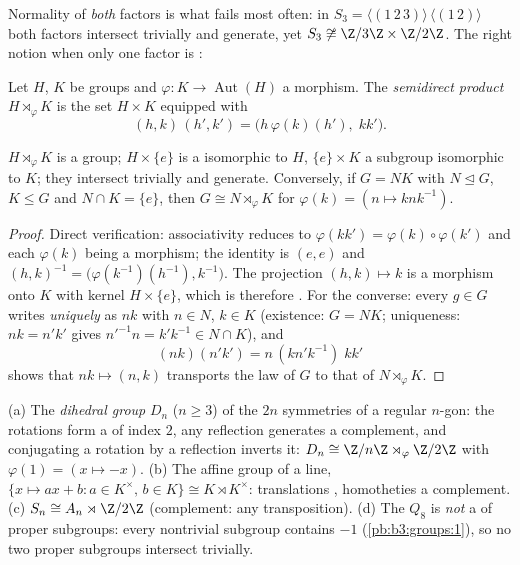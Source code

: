 Normality of \emph{both} factors is what fails most often: in $S_3
= \langle (1\,2\,3)\rangle \,\langle(1\,2)\rangle$ both factors
intersect trivially and generate, yet $S_3 \not\cong \Z/3\Z \times
\Z/2\Z$. The right notion when only one factor is :

\begin{definition}\label{def:b3:groups:semidirect}
Let $H$, $K$ be groups and $\varphi \colon K \to
\operatorname{Aut}(H)$ a morphism. The \emph{semidirect
product} $H \rtimes_\varphi K$ is the
set $H \times K$ equipped with
\[
(h, k)\,(h', k') = \bigl(h\,\varphi(k)(h'),\; kk'\bigr).
\]
\end{definition}

\begin{proposition}\label{prop:b3:groups:semidirect}
$H \rtimes_\varphi K$ is a group; $H \times \{e\}$ is a  isomorphic to $H$, $\{e\} \times K$ a subgroup isomorphic
to $K$; they intersect trivially and generate. Conversely, if $G =
NK$ with $N \trianglelefteq G$, $K \leq G$ and $N \cap K = \{e\}$,
then $G \cong N \rtimes_\varphi K$ for $\varphi(k) = (n \mapsto
knk^{-1})$.
\end{proposition}

\begin{proof}
Direct verification: associativity reduces to $\varphi(kk') =
\varphi(k)\circ\varphi(k')$ and each $\varphi(k)$ being a morphism;
the identity is $(e,e)$ and $(h,k)^{-1} =
\bigl(\varphi(k^{-1})(h^{-1}), k^{-1}\bigr)$. The projection $(h,k)
\mapsto k$ is a morphism onto $K$ with kernel $H \times \{e\}$,
which is therefore . For the converse: every $g \in G$ writes
\emph{uniquely} as $nk$ with $n \in N$, $k \in K$ (existence: $G =
NK$; uniqueness: $nk = n'k'$ gives $n'^{-1}n = k'k^{-1} \in N \cap
K$), and
\[
(nk)(n'k') = n\,(kn'k^{-1})\;kk'
\]
shows that $nk \mapsto (n, k)$ transports the law of $G$ to that
of $N \rtimes_\varphi K$.
\end{proof}

\begin{example}\label{ex:b3:groups:semidirectexamples}
(a) The \emph{dihedral group} $D_n$ ($n \geq
3$) of the $2n$ symmetries of a regular $n$-gon: the rotations form
a  of index $2$, any reflection generates a
complement, and conjugating a rotation by a reflection inverts it:
$D_n \cong \Z/n\Z \rtimes_\varphi \Z/2\Z$ with $\varphi(1) = (x
\mapsto -x)$.
(b) The affine group of a line, $\{x \mapsto ax + b : a \in
K^\times,\, b \in K\} \cong K \rtimes K^\times$: translations
, homotheties a complement.
(c) $S_n \cong A_n \rtimes \Z/2\Z$ (complement: any
transposition).
(d) The  $Q_8$ is \emph{not} a 
of proper subgroups: every nontrivial subgroup contains $-1$
(\cref{pb:b3:groups:1}), so no two proper subgroups intersect
trivially.
\end{example}

